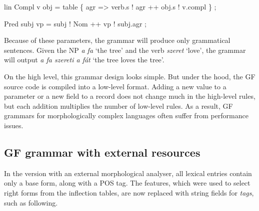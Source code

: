 \documentclass[10pt,a4paper]{article}
\newenvironment{Shaded}{\begin{snugshade}}{\end{snugshade}}
\newcommand{\DataTypeTok}[1]{\textcolor[rgb]{0.13,0.29,0.53}{{#1}}}
\newcommand{\OtherTok}[1]{\textcolor[rgb]{0.56,0.35,0.01}{{#1}}}
\newcommand{\FunctionTok}[1]{\textcolor[rgb]{0.00,0.00,0.00}{{#1}}}
\newcommand{\NormalTok}[1]{{#1}}
\begin{document}
\begin{Shaded}
\begin{Highlighting}[]
\NormalTok{lin }
  \DataTypeTok{Compl} \NormalTok{v obj }\FunctionTok{=}
   \NormalTok{table \{ agr }\OtherTok{=>} \NormalTok{verb}\FunctionTok{.}\NormalTok{s }\FunctionTok{!} \NormalTok{agr}
               \FunctionTok{++} \NormalTok{obj}\FunctionTok{.}\NormalTok{s }\FunctionTok{!} \NormalTok{v}\FunctionTok{.}\NormalTok{compl \} ;}

  \DataTypeTok{Pred} \NormalTok{subj vp }\FunctionTok{=} \NormalTok{subj }\FunctionTok{!} \DataTypeTok{Nom} 
              \FunctionTok{++} \NormalTok{vp }\FunctionTok{!} \NormalTok{subj}\FunctionTok{.}\NormalTok{agr ;}
\end{Highlighting}
\end{Shaded}




Because of these parameters, the grammar will produce only grammatical
sentences. Given the NP \emph{a fa} `the tree' and the verb
\emph{szeret} `love', the grammar will output \emph{a fa szereti a
  f\'{a}t} `the tree loves the tree'.

On the high level, this grammar design looks simple. 
But under the hood, the GF source code is compiled into a low-level
format. Adding a new value to a parameter or a new field to a record 
does not change much in the high-level rules, but each addition
multiplies the number of low-level rules. As a result, GF grammars for
morphologically complex languages often suffer from performance issues.


\subsection{GF grammar with external resources}

In the version with an external morphological analyser, all lexical
entries contain only a base form, along with a POS tag. The features,
which were used to select right forms from the inflection tables, are
now replaced with string fields for \emph{tags}, such as following.
\end{document}

